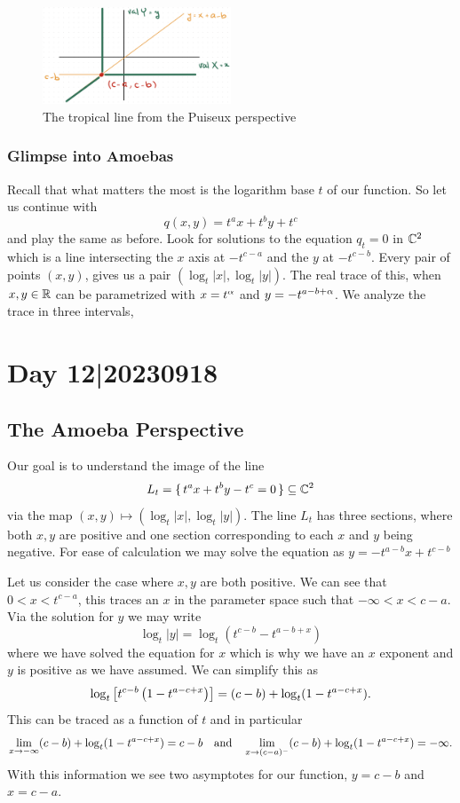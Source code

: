 \documentclass[12pt]{memoir}
\begin{document}
\begin{figure}[h!]
    \centering
    \includegraphics[width=0.5\textwidth]{figs/fig7-2-TropicalLinePuiseuxExample.png}
    \caption{The tropical line from the Puiseux perspective}
    \label{fig:7.2-TropicalLinePuiseuxExample}
\end{figure}

\subsubsection{Glimpse into Amoebas}

Recall that what matters the most is the logarithm base $t$ of our function. So let us continue with 
$$q(x,y)=t^ax+t^by+t^c$$
and play the same as before. Look for solutions to the equation $q_t=0$ in $\mathbb{C}^2$ which is a line intersecting the $x$ axis at $-t^{c-a}$ and the $y$ at $-t^{c-b}$. Every pair of points $(x,y)$, gives us a pair $(\log_t|x|,\log_t|y|)$. The real trace of this, when $x,y\in\mathbb{R}$ can be parametrized with $x=t^\alpha$ and $y=-t^{a-b+\alpha}$. We analyze the trace in three intervals, 

\section{Day 12|20230918}

\subsection{The Amoeba Perspective}%

Our goal is to understand the image of the line 
$$L_t=\{\,t^ax+t^by-t^c=0\,\}\subseteq\mathbb{C}^2$$
via the map $(x,y)\mapsto (\log_t|x|,\log_t|y|)$. The line $L_t$ has three sections, where both $x,y$ are positive and one section corresponding to each $x$ and $y$ being negative. For ease of calculation we may solve the equation as $y=-t^{a-b}x+t^{c-b}$\par 
Let us consider the case where $x,y$ are both positive. We can see that $0<x<t^{c-a}$, this traces an $x$ in the parameter space such that $-\infty<x<c-a$. Via the solution for $y$ we may write 
$$\log_t|y|=\log_t(t^{c-b}-t^{a-b+x})$$
where we have solved the equation for $x$ which is why we have an $x$ exponent and $y$ is positive as we have assumed. We can simplify this as 
$$\log_t\left\lbrack t^{c-b}\left(1-t^{a-c+x}\right)\right\rbrack=(c-b)+\log_t(1-t^{a-c+x}).$$
This can be traced as a function of $t$ and in particular
$$\lim_{x\to-\infty}(c-b)+\log_t(1-t^{a-c+x})=c-b\quad\text{and}\quad\lim_{x\to(c-a)^{-}}(c-b)+\log_t(1-t^{a-c+x})=-\infty.$$
With this information we see two asymptotes for our function, $y=c-b$ and $x=c-a$.
\end{document}
